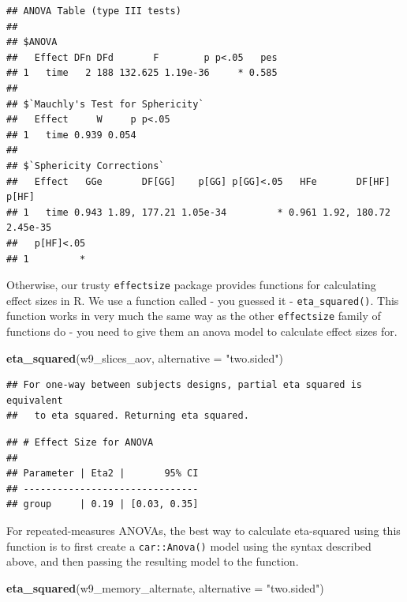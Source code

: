 \documentclass[
]{book}
\newenvironment{Shaded}{\begin{snugshade}}{\end{snugshade}}
\newcommand{\AttributeTok}[1]{\textcolor[rgb]{0.13,0.29,0.53}{#1}}
\newcommand{\FunctionTok}[1]{\textcolor[rgb]{0.13,0.29,0.53}{\textbf{#1}}}
\newcommand{\NormalTok}[1]{#1}
\newcommand{\StringTok}[1]{\textcolor[rgb]{0.31,0.60,0.02}{#1}}
\begin{document}
\begin{verbatim}
## ANOVA Table (type III tests)
## 
## $ANOVA
##   Effect DFn DFd       F        p p<.05   pes
## 1   time   2 188 132.625 1.19e-36     * 0.585
## 
## $`Mauchly's Test for Sphericity`
##   Effect     W     p p<.05
## 1   time 0.939 0.054      
## 
## $`Sphericity Corrections`
##   Effect   GGe       DF[GG]    p[GG] p[GG]<.05   HFe       DF[HF]    p[HF]
## 1   time 0.943 1.89, 177.21 1.05e-34         * 0.961 1.92, 180.72 2.45e-35
##   p[HF]<.05
## 1         *
\end{verbatim}

Otherwise, our trusty \texttt{effectsize} package provides functions for calculating effect sizes in R. We use a function called - you guessed it - \texttt{eta\_squared()}. This function works in very much the same way as the other \texttt{effectsize} family of functions do - you need to give them an anova model to calculate effect sizes for.

\begin{Shaded}
\begin{Highlighting}[]
\FunctionTok{eta\_squared}\NormalTok{(w9\_slices\_aov, }\AttributeTok{alternative =} \StringTok{"two.sided"}\NormalTok{)}
\end{Highlighting}
\end{Shaded}

\begin{verbatim}
## For one-way between subjects designs, partial eta squared is equivalent
##   to eta squared. Returning eta squared.
\end{verbatim}

\begin{verbatim}
## # Effect Size for ANOVA
## 
## Parameter | Eta2 |       95% CI
## -------------------------------
## group     | 0.19 | [0.03, 0.35]
\end{verbatim}

For repeated-measures ANOVAs, the best way to calculate eta-squared using this function is to first create a \texttt{car::Anova()} model using the syntax described above, and then passing the resulting model to the function.

\begin{Shaded}
\begin{Highlighting}[]
\FunctionTok{eta\_squared}\NormalTok{(w9\_memory\_alternate, }\AttributeTok{alternative =} \StringTok{"two.sided"}\NormalTok{)}
\end{Highlighting}
\end{Shaded}
\end{document}
